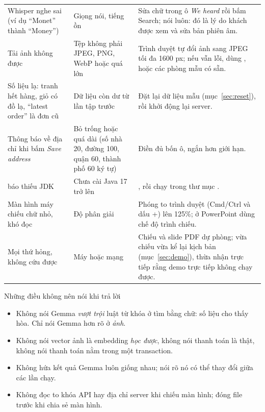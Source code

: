 \begin{longtable}{@{}P{3.3cm}P{3.9cm}P{8.6cm}@{}}
\addlinespace
Whisper nghe sai (ví dụ ``Monet'' thành ``Money'') & Giọng nói, tiếng ồn & Sửa chữ trong ô \emph{We heard} rồi bấm Search; nói luôn: đó là lý do khách được xem và sửa bản phiên âm.\\
\addlinespace
Tải ảnh không được & Tệp không phải JPEG, PNG, WebP hoặc quá lớn & Trình duyệt tự đổi ảnh sang JPEG tối đa 1600 px; nếu vẫn lỗi, dùng ,  hoặc các phòng mẫu có sẵn.\\
\addlinespace
Số liệu lạ: tranh hết hàng, giỏ có đồ lạ, ``latest order'' là đơn cũ & Dữ liệu còn dư từ lần tập trước & Đặt lại dữ liệu mẫu (mục~\ref{sec:reset}), rồi khởi động lại server.\\
\addlinespace
Thông báo về địa chỉ khi bấm \emph{Save address} & Bỏ trống hoặc quá dài (số nhà 20, đường 100, quận 60, thành phố 60 ký tự) & Điền đủ bốn ô, ngắn hơn giới hạn.\\
\addlinespace
{} báo thiếu JDK & Chưa cài Java 17 trở lên & , rồi chạy  trong thư mục .\\
\addlinespace
Màn hình máy chiếu chữ nhỏ, khó đọc & Độ phân giải & Phóng to trình duyệt (Cmd/Ctrl và dấu +) lên 125\%; ở PowerPoint dùng chế độ trình chiếu.\\
\addlinespace
Mọi thứ hỏng, không cứu được & Máy hoặc mạng & Chiếu  và slide PDF dự phòng; vừa chiếu vừa kể lại kịch bản (mục~\ref{sec:demo}), thừa nhận trực tiếp rằng demo trực tiếp không chạy được.\\
\bottomrule
\end{longtable}

\begin{note}[warn]{Những điều không nên nói khi trả lời}
\begin{itemize}
\item Không nói Gemma \emph{vượt trội} luật từ khóa ở tìm bằng chữ: số liệu cho thấy hòa. Chỉ nói Gemma hơn rõ ở \emph{ảnh}.
\item Không nói vector ảnh là embedding \emph{học được}, không nói thanh toán là thật, không nói thanh toán nằm trong một transaction.
\item Không hứa kết quả Gemma luôn giống nhau; nói rõ nó có thể thay đổi giữa các lần chạy.
\item Không đọc to khóa API hay địa chỉ server khi chiếu màn hình; đóng file  trước khi chia sẻ màn hình.
\end{itemize}
\end{note}
